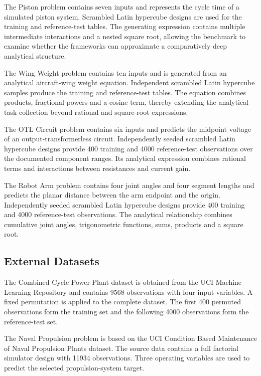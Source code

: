 \documentclass[12pt,oneside,bibtotoc,liststotoc]{scrbook}
\begin{document}
The Piston problem contains seven inputs and represents the cycle time of a simulated piston system. Scrambled Latin hypercube designs are used for the training and reference-test tables. The generating expression contains multiple intermediate interactions and a nested square root, allowing the benchmark to examine whether the frameworks can approximate a comparatively deep analytical structure.

The Wing Weight problem contains ten inputs and is generated from an analytical aircraft-wing weight equation. Independent scrambled Latin hypercube samples produce the training and reference-test tables. The equation combines products, fractional powers and a cosine term, thereby extending the analytical task collection beyond rational and square-root expressions.

The OTL Circuit problem contains six inputs and predicts the midpoint voltage of an output-transformerless circuit. Independently seeded scrambled Latin hypercube designs provide 400 training and 4000 reference-test observations over the documented component ranges. Its analytical expression combines rational terms and interactions between resistances and current gain.

The Robot Arm problem contains four joint angles and four segment lengths and predicts the planar distance between the arm endpoint and the origin. Independently seeded scrambled Latin hypercube designs provide 400 training and 4000 reference-test observations. The analytical relationship combines cumulative joint angles, trigonometric functions, sums, products and a square root.

\subsection{External Datasets}

The Combined Cycle Power Plant dataset is obtained from the UCI Machine Learning Repository and contains 9568 observations with four input variables. A fixed permutation is applied to the complete dataset. The first 400 permuted observations form the training set and the following 4000 observations form the reference-test set.

The Naval Propulsion problem is based on the UCI Condition Based Maintenance of Naval Propulsion Plants dataset. The source data contains a full factorial simulator design with 11934 observations. Three operating variables are used to predict the selected propulsion-system target.
\end{document}

